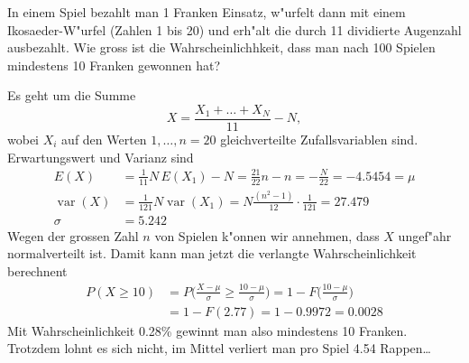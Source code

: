 In einem Spiel bezahlt man 1 Franken Einsatz, w"urfelt dann mit
einem Ikosaeder-W"urfel (Zahlen 1 bis 20) und erh"alt die durch 11 dividierte
Augenzahl ausbezahlt. Wie gross ist die Wahrscheinlichhkeit,
dass man nach 100 Spielen mindestens 10 Franken gewonnen hat?

\begin{loesung}
Es geht um die Summe
\[
X=\frac{X_1+\dots +X_N}{11} - N,
\]
wobei $X_i$ auf den
Werten $1,\dots,n=20$ gleichverteilte Zufallsvariablen sind.
Erwartungswert und Varianz
sind
\begin{align*}
E(X)&=\frac1{11}N\,E(X_1)-N=\frac{21}{22}n-n=-\frac{N}{22}
=-4.5454=\mu
\\
\operatorname{var}(X)&=\frac1{121}N\operatorname{var}(X_1)=N\frac{(n^2-1)}{12}\cdot\frac1{121}
=27.479
\\
\sigma&=5.242
\end{align*}
Wegen der grossen Zahl $n$ von Spielen k"onnen wir annehmen, dass
$X$ ungef"ahr normalverteilt ist.
Damit kann man jetzt die verlangte Wahrscheinlichkeit berechnent
\begin{align*}
P(X \ge 10)&=P\biggl(
\frac{X-\mu}{\sigma}\ge\frac{10-\mu}{\sigma}
\biggr)
=1-F\biggl(
\frac{10-\mu}{\sigma}
\biggr)
\\
&=1-F(2.77)=1-0.9972=0.0028
\end{align*}
Mit Wahrscheinlichkeit 0.28\% gewinnt man also mindestens 10 Franken.
Trotzdem lohnt es sich nicht, im Mittel verliert man pro Spiel
4.54 Rappen\dots
\end{loesung}

